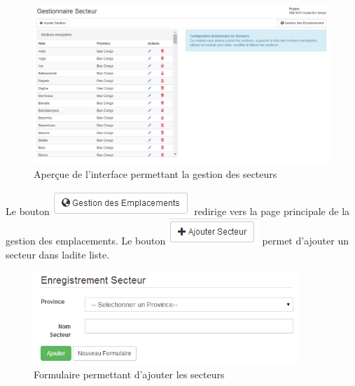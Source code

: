 \documentclass[12pt,a4paper]{report}
\begin{document}
\begin{figure}[h]
\begin{center}
\includegraphics[width=12cm]{pic/FormulaireGestionSecteur.png}
\end{center}
\caption{Aperçue de l'interface permettant la gestion des secteurs}
\label{Aperçue de l'interface permettant la gestion des secteurs}
\end{figure}

Le bouton \includegraphics[scale=0.7]{pic/GestionEmplacement.png} redirige vers la page principale de la gestion des emplacements.
Le bouton \includegraphics[scale=0.7]{pic/AddSecteur.png} permet d'ajouter un secteur dans ladite liste.

\begin{figure}[h]
\begin{center}
\includegraphics[width=10cm]{pic/FormAddSecteur.png}
\end{center}
\caption{Formulaire permettant d'ajouter les secteurs}
\label{Formulaire permettant d'ajouter les secteurs}
\end{figure}
\end{document}
